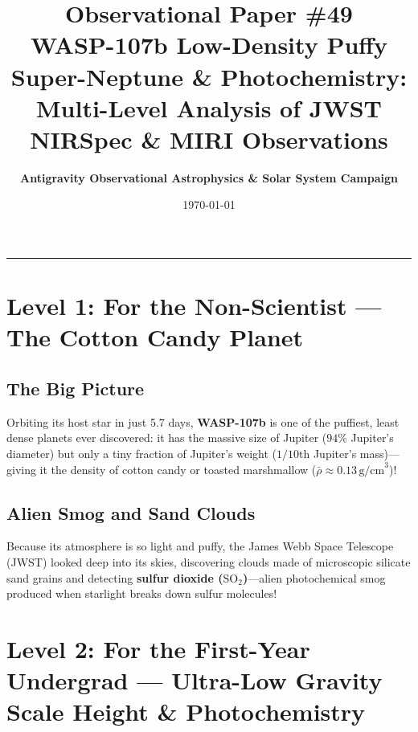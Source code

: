 \documentclass[11pt,a4paper]{article}
\title{\Huge \textbf{Observational Paper \#49}\\ \Large WASP-107b Low-Density Puffy Super-Neptune \& Photochemistry: Multi-Level Analysis of JWST NIRSpec \& MIRI Observations}
\author{\textbf{Antigravity Observational Astrophysics \& Solar System Campaign}}
\date{\today}
\begin{document}
\maketitle

\vspace{-1em}
\begin{center}
\rule{\textwidth}{1.5pt}
\end{center}

\section*{Level 1: For the Non-Scientist — The Cotton Candy Planet}

\subsection*{The Big Picture}
Orbiting its host star in just 5.7 days, \textbf{WASP-107b} is one of the puffiest, least dense planets ever discovered: it has the massive size of Jupiter ($94\%$ Jupiter's diameter) but only a tiny fraction of Jupiter's weight ($1/10\text{th}$ Jupiter's mass)—giving it the density of cotton candy or toasted marshmallow ($\bar{\rho} \approx 0.13\,\text{g/cm}^3$)!

\subsection*{Alien Smog and Sand Clouds}
Because its atmosphere is so light and puffy, the James Webb Space Telescope (JWST) looked deep into its skies, discovering clouds made of microscopic silicate sand grains and detecting \textbf{sulfur dioxide ($\mathrm{SO_2}$)}—alien photochemical smog produced when starlight breaks down sulfur molecules!

\newpage

\section*{Level 2: For the First-Year Undergrad — Ultra-Low Gravity Scale Height \& Photochemistry}
\end{document}
